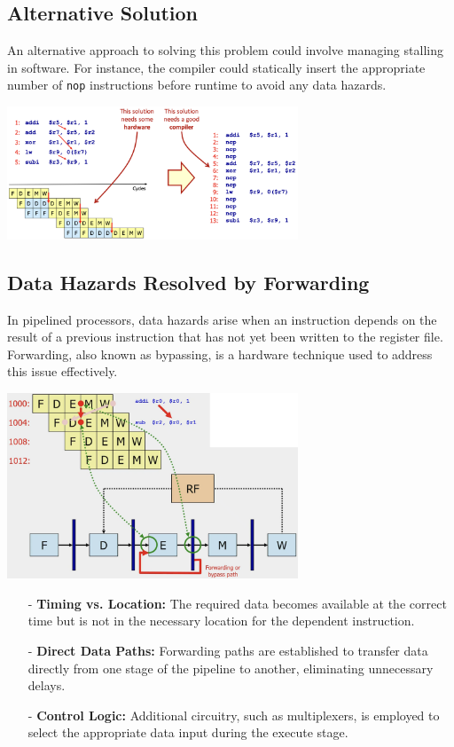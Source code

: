 \subsection{Alternative Solution}
An alternative approach to solving this problem could involve managing stalling in software. For instance, the compiler could statically insert the appropriate number of \texttt{nop} instructions before runtime to avoid any data hazards.
\begin{center}
    \includegraphics[width=0.65\textwidth]{chapters/chapter4c/images/solution2.png}
\end{center}
\newpage
\subsection{Data Hazards Resolved by Forwarding}
In pipelined processors, data hazards arise when an instruction depends on the result of a previous instruction that has not yet been written to the register file. Forwarding, also known as bypassing, is a hardware technique used to address this issue effectively.
\begin{center}
    \includegraphics[width=0.65\textwidth]{chapters/chapter4c/images/forwarding.png}
\end{center}
\begin{itemize}
    \item[-] \textbf{Timing vs. Location:} The required data becomes available at the correct time but is not in the necessary location for the dependent instruction.
    \item[-] \textbf{Direct Data Paths:} Forwarding paths are established to transfer data directly from one stage of the pipeline to another, eliminating unnecessary delays.
    \item[-] \textbf{Control Logic:} Additional circuitry, such as multiplexers, is employed to select the appropriate data input during the execute stage.
\end{itemize}

